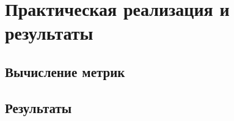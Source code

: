 \chapter{Практическая реализация и результаты}

\FloatBarrier

\section{Вычисление метрик}

\FloatBarrier

\section{Результаты}

\FloatBarrier

